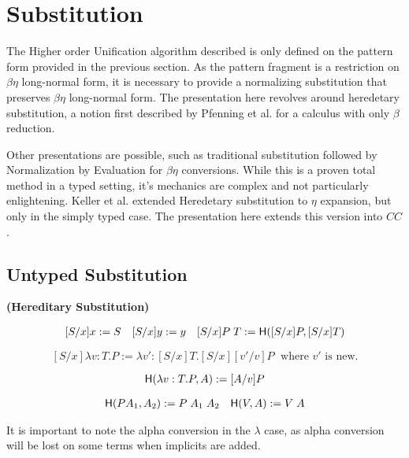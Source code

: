 \section{Substitution}

The Higher order Unification algorithm described is only defined on the pattern form provided in the previous section.
As the pattern fragment is a restriction on $\beta\eta$ long-normal form, it is necessary to provide a normalizing
substitution that preserves $\beta\eta$ long-normal form.  The presentation here
revolves around heredetary substitution, a notion first described by Pfenning et al. \citep{pfenning1991logic} for
a calculus with only $\beta$ reduction.

Other presentations are possible, such as traditional substitution followed by Normalization by Evaluation 
for $\beta\eta$ conversions\citep{abel2010towards}. 
While this is a proven total method in a typed setting, it's mechanics
are complex and not particularly enlightening.  
Keller et al. \citep{keller2010normalization}
extended Heredetary substitution to $\eta$ expansion, but only in the simply typed case. 
The presentation here extends this version into $CC$.

\subsection{Untyped Substitution}

\begin{definition}
\textbf{(Hereditary Substitution)} 

\[ \begin{array}[3]{llr}
[ S / x ] x := S
&
[S / x] y := y
&
[S / x] P\;T := \m{H}([S/x] P, [S/x]T)
\end{array} \]

\[
[S / x] \lambda v : T . P := \lambda v' : [S/x]T . [S/x][v'/v]P
\;
\text{  where $v'$ is new.}
\]

\[ 
\mathsf{H}(\lambda v : T . P , A) := [A/v] P
\]

\[ \begin{array}[2]{lr}
\m{H}(P A_1 , A_2) := P\;A_1\;A_2
&
\m{H}(V , A) := V\; A
\end{array} \]

\label{def:hered}
\end{definition}

It is important to note the alpha conversion in the $\lambda$ case, as alpha conversion will be lost on 
some terms when implicits are added.

